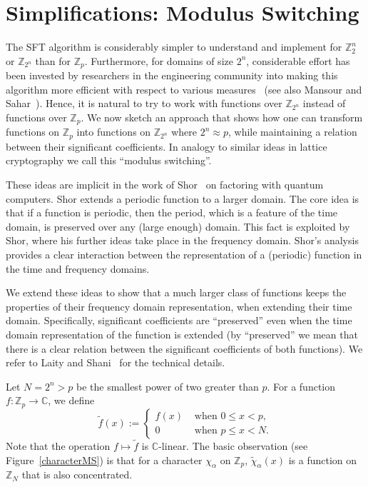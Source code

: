 \documentclass[11pt]{article}
\theoremstyle{definition}
\newcommand{\Z}{\mathbb{Z}}
\newcommand{\C}{\mathbb{C}}
\begin{document}
\section{Simplifications: Modulus Switching} \label{sec:mod-switch}

The SFT algorithm is considerably simpler to understand and implement for $\Z_2^n$ or $\Z_{2^n}$ than for $\Z_p$.
Furthermore, for domains of size $2^n$, considerable effort has been invested by researchers in the engineering community into making this algorithm more efficient with respect to various measures~\cite{Fourier_survey} (see also Mansour and Sahar~\cite{ManSah}).
Hence, it is natural to try to work with functions over $\Z_{2^n}$ instead of functions over $\Z_p$.
We now sketch an approach that shows how one can transform functions on $\Z_p$ into functions on $\Z_{2^n}$ where $2^n \approx p$, while maintaining a relation between their significant coefficients.
In analogy to similar ideas in lattice cryptography we call this ``modulus switching''.


These ideas are implicit in the work of Shor~\cite{Shor} on factoring with quantum computers.
Shor extends a periodic function to a larger domain. The core idea is that if a function is periodic, then the period, which is a feature of the time domain, is preserved over any (large enough) domain. This fact is exploited by Shor, where his further ideas take place in the frequency domain.
Shor's analysis provides a clear interaction between the representation of a (periodic) function in the time and frequency domains.

We extend these ideas to show that a much larger class of functions keeps the properties of their frequency domain representation, when extending their time domain. Specifically, significant coefficients are ``preserved'' even when the time domain representation of the function is extended (by ``preserved'' we mean that there is a clear relation between the significant coefficients of both functions).
We refer to Laity and Shani~\cite{LS} for the technical details.

Let $N = 2^n > p$ be the smallest power of two greater than $p$. For a function $f:\Z_p\to\C$, we define
\[
    \widetilde{f}(x) := \left\{ \begin{array}{ll} f(x) & \text{ when } 0 \le x < p , \\
        0         & \text{ when } p \le x < N .\end{array} \right.
\]
Note that the operation $f \mapsto \widetilde{f}$ is $\C$-linear.
The basic observation (see Figure~\ref{characterMS}) is that for a character $\chi_{\alpha}$ on $\Z_p$,
$ \widetilde{\chi}_\alpha(x)$ is a function on $\Z_N$ that is also concentrated.
\end{document}
